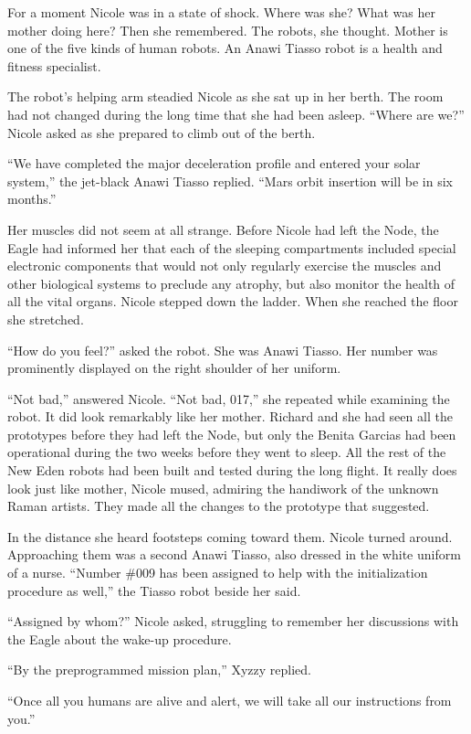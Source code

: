 \documentclass[]{article}
\begin{document}
{For a moment Nicole was in a state of shock.  Where was she? What was her mother doing here? Then she remembered.  The robots, she thought.  Mother is one of the five kinds of human robots.  An Anawi Tiasso robot is a health and fitness specialist.

The robot’s helping arm steadied Nicole as she sat up in her berth.  The room had not changed during the long time that she had been asleep.  “Where are we?” Nicole asked as she prepared to climb out of the berth.

“We have completed the major deceleration profile and entered your solar system,” the jet-black Anawi Tiasso replied.  “Mars orbit insertion will be in six months.”

Her muscles did not seem at all strange.  Before Nicole had left the Node, the Eagle had informed her that each of the sleeping compartments included special electronic components that would not only regularly exercise the muscles and other biological systems to preclude any atrophy, but also monitor the health of all the vital organs.  Nicole stepped down the ladder.  When she reached the floor she stretched.

“How do you feel?” asked the robot.  She was Anawi Tiasso.  Her number was prominently displayed on the right shoulder of her uniform.

“Not bad,” answered Nicole.  “Not bad, 017,” she repeated while examining the robot.  It did look remarkably like her mother.  Richard and she had seen all the prototypes before they had left the Node, but only the Benita Garcias had been operational during the two weeks before they went to sleep.  All the rest of the New Eden robots had been built and tested during the long flight.  It really does look just like mother, Nicole mused, admiring the handiwork of the unknown Raman artists.  They made all the changes to the prototype that suggested.

In the distance she heard footsteps coming toward them.  Nicole turned around.  Approaching them was a second Anawi Tiasso, also dressed in the white uniform of a nurse.  “Number \#009 has been assigned to help with the initialization procedure as well,” the Tiasso robot beside her said.

“Assigned by whom?” Nicole asked, struggling to remember her discussions with the Eagle about the wake-up procedure.

“By the preprogrammed mission plan,” Xyzzy replied.

“Once all you humans are alive and alert, we will take all our instructions from you.”

}
\end{document}
